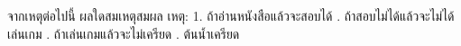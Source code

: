 ﻿%
\question จากเหตุต่อไปนี้ ผลใดสมเหตุสมผล \newline
เหตุ: 1. ถ้าอ่านหนังสือแล้วจะสอบได้ . ถ้าสอบไม่ได้แล้วจะไม่ได้เล่นเกม . ถ้าเล่นเกมแล้วจะไม่เครียด . ต้นน้ำเครียด \newline
\newline
{}
